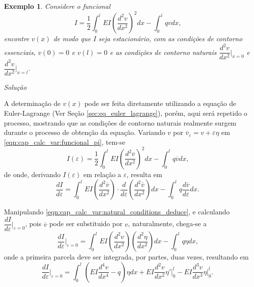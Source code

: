 \documentclass[
	12pt,				%
	openright,			%
    twoside,			%
	a4paper,			%
	english,			%
	french,				%
	spanish,			%
	brazil				%
	]{abntex2}
\makeatletter
\newtheorem{exemplo}{Exemplo}
\renewenvironment{proof}[1][\proofname]{
	\par\pushQED{\qed}%
	\normalfont \topsep6\p@\@plus6\p@\relax
	\trivlist
	\item\relax
		{\itshape
			#1\@addpunct{.}}\hspace\labelsep\ignorespaces
}{%
	\popQED\endtrivlist\@endpefalse
}
\newenvironment{solution}{
	\begin{proof}[Solução]
}{%
	\end{proof}
}
\numberwithin{lema}{chapter}
\numberwithin{teorema}{chapter}
\numberwithin{definicao}{chapter}
\numberwithin{exemplo}{chapter}
\numberwithin{figure}{chapter}
\makeatother
\begin{document}
\begin{exemplo}
	\label{ex:cond_contorno}
	Considere o funcional
	\begin{equation}
		\label{eqn:cap_calc_var:funcional_pi}
		I = \frac{1}{2}	\int_{0}^{l}
			EI \left (
				\frac{d^2v}{dx^2}
			\right )^2 dx
			-
			\int_{0}^{l} qv dx
			\text{,}
	\end{equation}
	encontre $v(x)$ de modo que $I$ seja estacionário, com as condições de contorno essenciais, $v(0)=0$ e $v(l)=0$ e as condições de contorno naturais $\dfrac{d^2v}{dx^2}\Big |_{x=0}$ e $\dfrac{d^2v}{dx^2}\Big |_{x=l}$.
\end{exemplo}
\begin{solution}
	A determinação de $v(x)$ pode ser feita diretamente utilizando a equação de Euler-Lagrange (Ver Seção \ref{sec:eq_euler_lagrange}), porém, aqui será repetido o processo, mostrando que as condições de contorno naturais realmente surgem durante o processo de obtenção da equação. Variando $v$ por $\overline{v}_{\varepsilon}=v+\varepsilon \eta$ em \eqref{eqn:cap_calc_var:funcional_pi}, tem-se
	$$
		I(\varepsilon) = \frac{1}{2} \int_{0}^{l}
			EI \left (
				\frac{d^2\overline{v}}{dx^2}
			\right )^2 dx
			-
			\int_{0}^{l} q\overline{v} dx
			\text{,}
	$$
	de onde, derivando $I(\varepsilon)$ em relação a $\varepsilon$, resulta em
	\begin{equation}
		\label{eqn:cap_calc_var:natural_conditions_deduce}
		\frac{dI}{d\varepsilon} = 
			\int_{0}^{l} EI \left (
				\frac{d^2\overline{v}}{dx^2}
			\right ) \cdot 
			\frac{d}{d\varepsilon}\left (
				\frac{d^2\overline{v}}{dx^2}
			\right ) dx
			-
			\int_{0}^{l} q\frac{d\overline{v}}{d\varepsilon} dx
			\text{.}
	\end{equation}
	
	Manipulando \eqref{eqn:cap_calc_var:natural_conditions_deduce}, e calculando $\dfrac{dI}{d\varepsilon}\Big |_{\varepsilon=0}$, pois $\overline{v}$ pode ser substituido por $v$, naturalmente, chega-se a
	$$
		\frac{dI}{d\varepsilon}\Big |_{\varepsilon=0} = 
			\int_{0}^{l} EI \left (
				\frac{d^2v}{dx^2}
			\right ) \left (
				\frac{d^2\eta}{dx^2}
			\right ) dx
			-
			\int_{0}^{l}q\eta dx
		\text{,}
	$$
	onde a primeira parcela deve ser integrada, por partes, duas vezes, resultando em
	\begin{equation}
		\label{eqn:cap_calc_var:natural_conditions_I0}
		\frac{dI}{d\varepsilon}\Big |_{\varepsilon=0} = 
			\int_{0}^{l} \left (
				EI\frac{d^4 v}{dx^4}-q 
			\right ) \eta dx
			+
			EI\frac{d^2 v}{dx^2} \eta' \Big |_{0}^{l}
			-
			EI\frac{d^3 v}{dx^3} \eta \Big |_{0}^{l}
			\text{.}
	\end{equation}
	

\end{solution}
\end{document}
